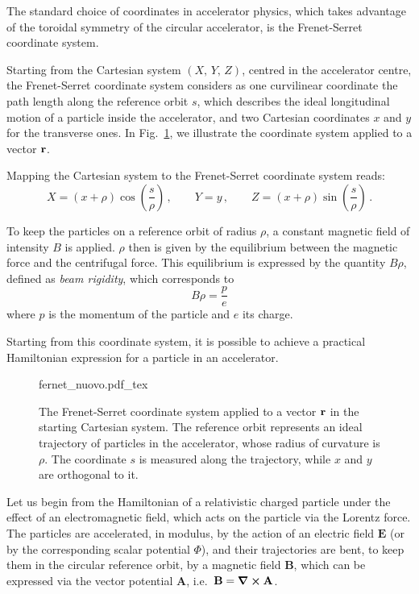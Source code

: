 The standard choice of coordinates in accelerator physics, which takes advantage of the toroidal symmetry of the circular accelerator, is the Frenet-Serret coordinate system.

Starting from the Cartesian system $(X,\, Y,\, Z)$, centred in the accelerator centre, the Frenet-Serret coordinate system considers as one curvilinear coordinate the path length along the reference orbit $s$, which describes the ideal longitudinal motion of a particle inside the accelerator, and two Cartesian coordinates $x$ and $y$ for the transverse ones. In Fig.~\ref{fig:frenserr}, we illustrate the coordinate system applied to a vector $\vb{r}$.

Mapping the Cartesian system to the Frenet-Serret coordinate system reads:
%
\begin{equation} 
    X = (x+\rho)\cos(\frac{s}{\rho})\,, \qquad Y=y\,, \qquad Z=(x+\rho)\sin(\frac{s}{\rho})\,.
\end{equation}

To keep the particles on a reference orbit of radius $\rho$, a constant magnetic field of intensity $B$ is applied. $\rho$ then is given by the equilibrium between the magnetic force and the centrifugal force. This equilibrium is expressed by the quantity $B\rho$, defined as \textit{beam rigidity}, which corresponds to
\begin{equation}
    B\rho = \frac{p}{e}
    \label{eq:beam_rigidity}
\end{equation}
where $p$ is the momentum of the particle and $e$ its charge.

Starting from this coordinate system, it is possible to achieve a practical Hamiltonian expression for a particle in an accelerator.

\begin{figure}
\centering
\def\svgwidth{0.75\columnwidth}
{fernet_nuovo.pdf_tex}
\caption{The Frenet-Serret coordinate system applied to a vector $\vb{r}$ in the starting Cartesian system. The reference orbit represents an ideal trajectory of particles in the accelerator, whose radius of curvature is $\rho$. The coordinate $s$ is measured along the trajectory, while $x$ and $y$ are orthogonal to it.}
\label{fig:frenserr}
\end{figure}

Let us begin from the Hamiltonian of a relativistic charged particle under the effect of an electromagnetic field, which acts on the particle via the Lorentz force. The particles are accelerated, in modulus, by the action of an electric field $\mathbf{E}$ (or by the corresponding scalar potential $\Phi$), and their trajectories are bent, to keep them in the circular reference orbit, by a magnetic field $\mathbf{B}$, which can be expressed via the vector potential $\mathbf{A}$, i.e.\ $\mathbf{B}=\curl\mathbf{A}$.

